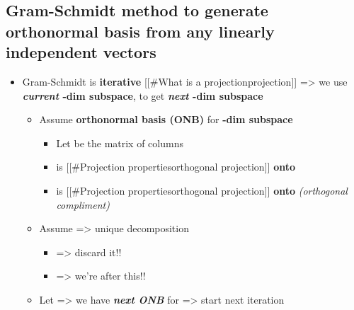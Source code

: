 \subsection*{Gram-Schmidt method to generate orthonormal basis from any
linearly independent
vectors}

\begin{itemize}

\item
  Gram-Schmidt is \textbf{iterative} {[}{[}\#What is a
  projection\textbar projection{]}{]} =\textgreater{} we use
  \textbf{\emph{current} -dim subspace}, to get
  \textbf{\emph{next} -dim subspace}

  \begin{itemize}
  
  \item
    Assume \textbf{orthonormal basis (ONB)}
    for \textbf{-dim subspace
    }

    \begin{itemize}
    
    \item
      Let
      be the matrix of columns
    \item
       is {[}{[}\#Projection
      properties\textbar orthogonal projection{]}{]} \textbf{onto
      }
    \item
      is {[}{[}\#Projection properties\textbar orthogonal
      projection{]}{]} \textbf{onto
      } \emph{(orthogonal
      compliment)}
    \end{itemize}
  \item
    Assume  =\textgreater{} unique
    decomposition

    \begin{itemize}
    
    \item
      =\textgreater{} discard it!!
    \item
      =\textgreater{} we're after this!!
    \end{itemize}
  \item
    Let 
    =\textgreater{} we have \textbf{\emph{next ONB}}
     for
     =\textgreater{} start next iteration


\end{itemize}
\end{itemize}
